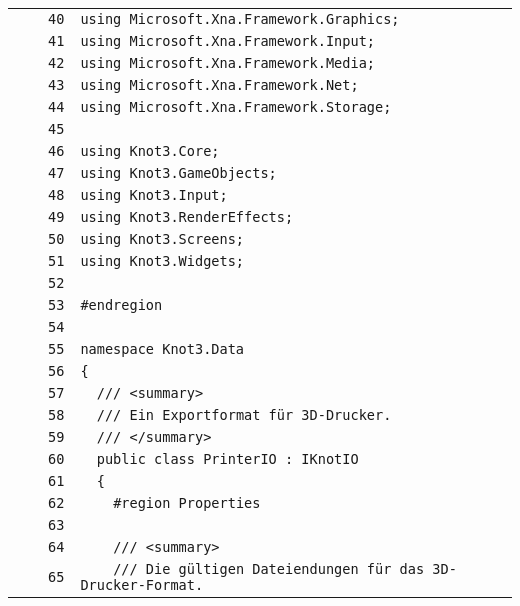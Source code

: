 \documentclass[a4paper,10pt]{article}
\begin{document}
\begin{longtable}[l]{lrrl}
\cellcolor{gray} &  & \verb~40~ & \verb~using Microsoft.Xna.Framework.Graphics;~\\
\cellcolor{gray} &  & \verb~41~ & \verb~using Microsoft.Xna.Framework.Input;~\\
\cellcolor{gray} &  & \verb~42~ & \verb~using Microsoft.Xna.Framework.Media;~\\
\cellcolor{gray} &  & \verb~43~ & \verb~using Microsoft.Xna.Framework.Net;~\\
\cellcolor{gray} &  & \verb~44~ & \verb~using Microsoft.Xna.Framework.Storage;~\\
\cellcolor{gray} &  & \verb~45~ & \verb~~\\
\cellcolor{gray} &  & \verb~46~ & \verb~using Knot3.Core;~\\
\cellcolor{gray} &  & \verb~47~ & \verb~using Knot3.GameObjects;~\\
\cellcolor{gray} &  & \verb~48~ & \verb~using Knot3.Input;~\\
\cellcolor{gray} &  & \verb~49~ & \verb~using Knot3.RenderEffects;~\\
\cellcolor{gray} &  & \verb~50~ & \verb~using Knot3.Screens;~\\
\cellcolor{gray} &  & \verb~51~ & \verb~using Knot3.Widgets;~\\
\cellcolor{gray} &  & \verb~52~ & \verb~~\\
\cellcolor{gray} &  & \verb~53~ & \verb~#endregion~\\
\cellcolor{gray} &  & \verb~54~ & \verb~~\\
\cellcolor{gray} &  & \verb~55~ & \verb~namespace Knot3.Data~\\
\cellcolor{gray} &  & \verb~56~ & \verb~{~\\
\cellcolor{gray} &  & \verb~57~ & \verb~  /// <summary>~\\
\cellcolor{gray} &  & \verb~58~ & \verb~  /// Ein Exportformat für 3D-Drucker.~\\
\cellcolor{gray} &  & \verb~59~ & \verb~  /// </summary>~\\
\cellcolor{gray} &  & \verb~60~ & \verb~  public class PrinterIO : IKnotIO~\\
\cellcolor{gray} &  & \verb~61~ & \verb~  {~\\
\cellcolor{gray} &  & \verb~62~ & \verb~    #region Properties~\\
\cellcolor{gray} &  & \verb~63~ & \verb~~\\
\cellcolor{gray} &  & \verb~64~ & \verb~    /// <summary>~\\
\cellcolor{gray} &  & \verb~65~ & \verb~    /// Die gültigen Dateiendungen für das 3D-Drucker-Format.~\\

\end{longtable}
\end{document}
